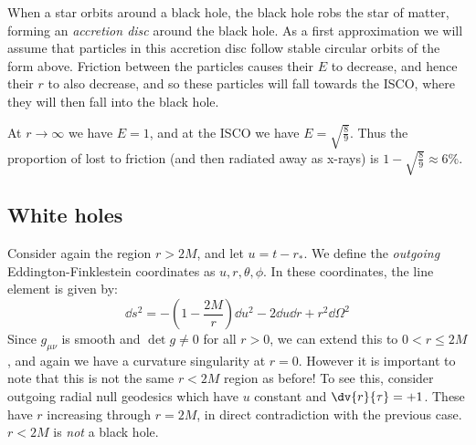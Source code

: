 \documentclass{jknotes}
\begin{document}
\begin{wrapfigure}{r}{0.4\linewidth}
    \centering
\end{wrapfigure}
When a star orbits around a black hole, the black hole robs the star of matter, forming an \emph{accretion disc} around the black hole. As a first approximation we will assume that particles in this accretion disc follow stable circular orbits of the form above. Friction between the particles causes their \(E\) to decrease, and hence their \(r\) to also decrease, and so these particles will fall towards the ISCO, where they will then fall into the black hole.

At \(r\to\infty\) we have \(E = 1\), and at the ISCO we have \(E=\sqrt{\frac{8}{9}}\). Thus the proportion of lost to friction (and then radiated away as x-rays) is \(1-\sqrt{\frac{8}{9}}\approx6\%\).

\subsection{White holes}
Consider again the region \(r>2M\), and let \(u = t-r_*\). We define the \emph{outgoing} Eddington-Finklestein coordinates as \(u,r,\theta,\phi\). In these coordinates, the line element is given by:
\begin{equation}
    \dd{s}^2=-\left( 1 - \frac{2M}{r} \right)\dd{u}^2-2\dd{u}\dd{r} + r^2\dd{\Omega}^2
\end{equation}
Since \(g_{\mu\nu}\) is smooth and \(\det g \ne 0\) for all \(r>0\), we can extend this to \(0 < r \le 2M\), and again we have a curvature singularity at \(r=0\). However it is important to note that this is not the same \(r < 2M\) region as before! To see this, consider outgoing radial null geodesics which have \(u\) constant and \(\dv{r}{\tau} = +1\). These have \(r\) increasing through \(r=2M\), in direct contradiction with the previous case. \(r < 2M\) is \emph{not} a black hole.
\end{document}
